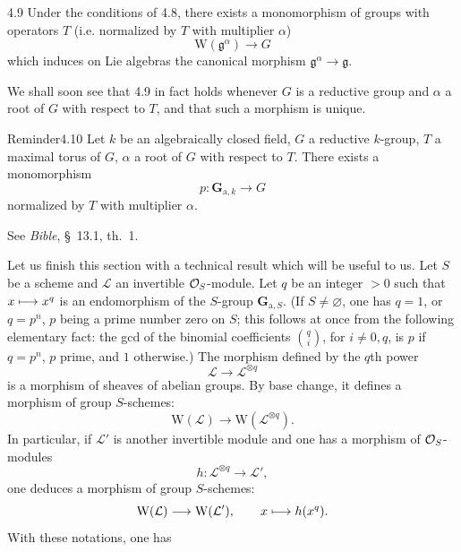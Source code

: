 \begin{corollary}{4.9}\label{XIX.4.9}
Under the conditions of 4.8, there exists a monomorphism of groups with operators $T$ (i.e. normalized by $T$ with multiplier $\alpha$)
\[
\mathrm W(\mathfrak g^\alpha)\to G
\]
which induces on Lie algebras the canonical morphism $\mathfrak g^\alpha\to\mathfrak g$.
\end{corollary}
We shall soon see that 4.9 in fact holds whenever $G$ is a reductive group and $\alpha$ a root of $G$ with respect to $T$, and that such a morphism is unique.

\begin{enoncerm}{Reminder}{4.10}\label{XIX.4.10}
Let $k$ be an algebraically closed field, $G$ a reductive $k$-group, $T$ a maximal torus of $G$, $\alpha$ a root of $G$ with respect to $T$. There exists a monomorphism
\[
p:\mathbf{G}_{\mathrm a,k}\to G
\]
normalized by $T$ with multiplier $\alpha$.
\end{enoncerm}
See \textit{Bible}, \S~13.1, th.~1.

 Let us finish this section with a technical result which will be useful to us. Let $S$ be a scheme and $\mathcal L$ an invertible $\mathcal{O}_S$-module. Let $q$ be an integer $>0$ such that $x\longmapsto x^q$ is an endomorphism of the $S$-group $\mathbf{G}_{\mathrm a,S}$. (If $S\ne\varnothing$, one has $q=1$, or $q=p^n$, $p$ being a prime number zero on $S$; this follows at once from the following elementary fact: the gcd of the binomial coefficients $\binom qi$, for $i\ne0,q$, is $p$ if $q=p^n$, $p$ prime, and $1$ otherwise.) The morphism defined by the $q$th power
\[
\mathcal L\to\mathcal L^{\otimes q}
\]
is a morphism of sheaves of abelian groups. By base change, it defines a morphism of group $S$-schemes:
\[
\mathrm W(\mathcal L)\to\mathrm W(\mathcal L^{\otimes q}).
\]
In particular, if $\mathcal L'$ is another invertible module and one has a morphism of $\mathcal{O}_S$-modules
\[
h:\mathcal L^{\otimes q}\to\mathcal L',
\]
one deduces a morphism of group $S$-schemes:
\[
\mathrm W(\mathcal L)\longrightarrow\mathrm W(\mathcal L'),\qquad x\longmapsto h(x^q).
\]
With these notations, one has

